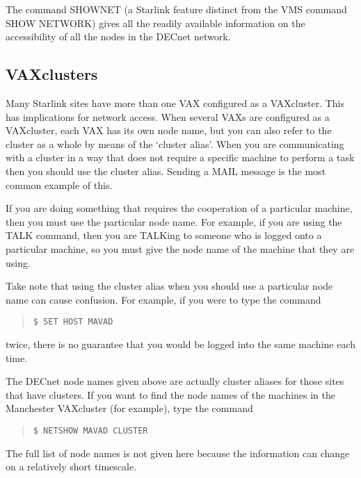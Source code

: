 The command SHOWNET (a Starlink feature distinct from the VMS command SHOW
NETWORK) gives all the readily available information on the accessibility
of all the nodes in the DECnet network.

\subsection{VAXclusters}
Many Starlink sites have more than one VAX configured as a
VAXcluster. This has implications for network access. When several VAXs are
configured as a VAXcluster, each VAX has its own node name, but you can also
refer to the cluster as a whole by means of the `cluster alias'. When you are
communicating with a cluster in a way that does not require a specific machine
to perform a task then you should use the cluster alias. Sending a MAIL message
is the most common example of this.

If you are doing something that requires the cooperation of a particular
machine, then you must use the particular node name. For example, if you are
using the TALK command, then you are TALKing to someone who is logged onto a
particular machine, so you must give the node name of the machine that they are
using.

Take note that using the cluster alias when you should use a particular node
name can cause confusion. For example, if you were to type the command
\begin{quote}
{\tt \$ SET HOST MAVAD}
\end{quote}
twice, there is no guarantee that you would be logged into the same machine
each time.

The DECnet node names
given above are actually cluster aliases for those sites that have clusters.
If you want to find the node names of the machines in the Manchester VAXcluster
(for example), type the command
\begin{quote}
{\tt \$ NETSHOW MAVAD CLUSTER}
\end{quote}
The full list of node names is not given here because the information can
change on a relatively short timescale.
